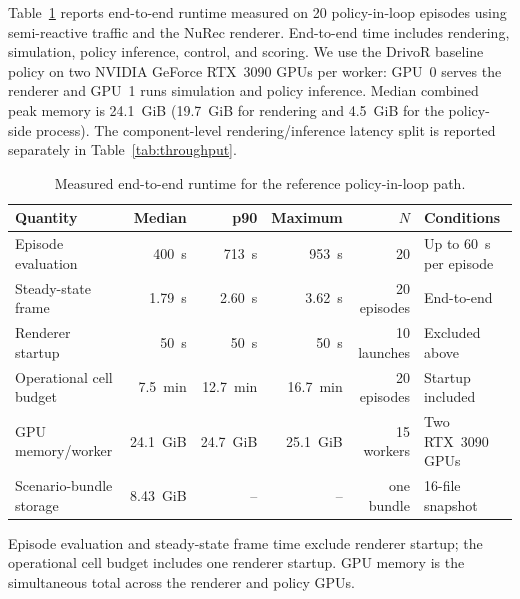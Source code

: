 Table~\ref{tab:runtime} reports end-to-end runtime measured on 20 policy-in-loop episodes using semi-reactive traffic and the NuRec renderer. End-to-end time includes rendering, simulation, policy inference, control, and scoring. We use the DrivoR baseline policy on two NVIDIA GeForce RTX~3090 GPUs per worker: GPU~0 serves the renderer and GPU~1 runs simulation and policy inference. Median combined peak memory is 24.1~GiB (19.7~GiB for rendering and 4.5~GiB for the policy-side process). The component-level rendering/inference latency split is reported separately in Table~\ref{tab:throughput}.

\begin{table}[t]
  \centering
  \caption{Measured end-to-end runtime for the reference policy-in-loop path.}
  \label{tab:runtime}
  \begin{tabular}{lrrrrl}
    \toprule
    Quantity & Median & p90 & Maximum & $N$ & Conditions \\
    \midrule
    Episode evaluation & 400~s & 713~s & 953~s & 20 & Up to 60~s per episode \\
    Steady-state frame & 1.79~s & 2.60~s & 3.62~s & 20 episodes & End-to-end \\
    Renderer startup & 50~s & 50~s & 50~s & 10 launches & Excluded above \\
    Operational cell budget & 7.5~min & 12.7~min & 16.7~min & 20 episodes & Startup included \\
    GPU memory/worker & 24.1~GiB & 24.7~GiB & 25.1~GiB & 15 workers & Two RTX~3090 GPUs \\
    Scenario-bundle storage & 8.43~GiB & -- & -- & one bundle & 16-file snapshot \\
    \bottomrule
  \end{tabular}
  \vspace{2pt}
  \footnotesize Episode evaluation and steady-state frame time exclude renderer startup; the operational cell budget includes one renderer startup. GPU memory is the simultaneous total across the renderer and policy GPUs.
\end{table}

